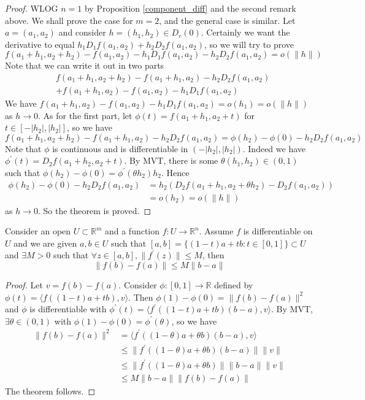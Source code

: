 \begin{proof}
    WLOG $n=1$ by Proposition \ref{component_diff} and the second remark above.
    We shall prove the case for $m=2$, and the general case is similar.
    Let $a=(a_1,a_2)$ and consider $h=(h_1,h_2)\in D_r(0)$.
    Certainly we want the derivative to equal $h_1D_1f(a_1,a_2)+h_2D_2f(a_1,a_2)$, so we will try to prove
    $$f(a_1+h_1,a_2+h_2)-f(a_1,a_2)-h_1D_1f(a_1,a_2)-h_2D_2f(a_1,a_2)=o(\|h\|)$$
    Note that we can write it out in two parts
    \begin{align*}
        &f(a_1+h_1,a_2+h_2)-f(a_1+h_1,a_2)-h_2D_2f(a_1,a_2)\\
        &+f(a_1+h_1,a_2)-f(a_1,a_2)-h_1D_1f(a_1,a_2)
    \end{align*}
    We have $f(a_1+h_1,a_2)-f(a_1,a_2)-h_1D_1f(a_1,a_2)=o(h_1)=o(\|h\|)$ as $h\to 0$.
    As for the first part, let $\phi(t)=f(a_1+h_1,a_2+t)$ for $t\in [-|h_2|,|h_2|]$, so we have
    $$f(a_1+h_1,a_2+h_2)-f(a_1+h_1,a_2)-h_2D_2f(a_1,a_2)=\phi(h_2)-\phi(0)-h_2D_2f(a_1,a_2)$$
    Note that $\phi$ is continuous and is differentiable in $(-|h_2|,|h_2|)$.
    Indeed we have $\phi^\prime(t)=D_2f(a_1+h_2,a_2+t)$.
    By MVT, there is some $\theta(h_1,h_2)\in (0,1)$ such that $\phi(h_2)-\phi(0)=\phi^\prime(\theta h_2)h_2$.
    Hence
    \begin{align*}
        \phi(h_2)-\phi(0)-h_2D_2f(a_1,a_2)&=h_2(D_2f(a_1+h_1,a_2+\theta h_2)-D_2f(a_1,a_2))\\
        &=o(h_2)=o(\|h\|)
    \end{align*}
    as $h\to 0$.
    So the theorem is proved.
\end{proof}
\begin{theorem}\label{mean_val_ineq}
    Consider an open $U\subset \mathbb R^m$ and a function $f:U\to\mathbb R^n$.
    Assume $f$ is differentiable on $U$ and we are given $a,b\in U$ such that $[a,b]=\{(1-t)a+tb:t\in [0,1]\}\subset U$ and $\exists M>0$ such that $\forall z\in [a,b],\|f^\prime(z)\|\le M$, then
    $$\|f(b)-f(a)\|\le M\|b-a\|$$
\end{theorem}
\begin{proof}
    Let $v=f(b)-f(a)$.
    Consider $\phi:[0,1]\to\mathbb R$ defined by $\phi(t)=\langle f((1-t)a+tb),v\rangle$.
    Then $\phi(1)-\phi(0)=\|f(b)-f(a)\|^2$ and $\phi$ is differentiable with $\phi^\prime(t)=\langle f^\prime((1-t)a+tb)(b-a),v\rangle$.
    By MVT, $\exists\theta\in (0,1)$ with $\phi(1)-\phi(0)=\phi^\prime(\theta)$, so we have
    \begin{align*}
        \|f(b)-f(a)\|^2&=\langle f^\prime((1-\theta)a+\theta b)(b-a),v\rangle\\
        &\le \|f^\prime((1-\theta)a+\theta b)(b-a)\|\|v\|\\
        &\le \|f^\prime((1-\theta)a+\theta b)\|\|b-a\|\|v\|\\
        &\le M\|b-a\|\|f(b)-f(a)\|
    \end{align*}
    The theorem follows.
\end{proof}
